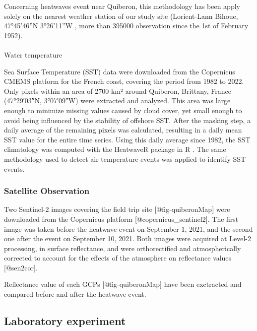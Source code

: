 \documentclass[
  number]{elsarticle}
\makeatletter
\let\oldparagraph\paragraph
\renewcommand{\paragraph}{
    \@ifstar
      \xxxParagraphStar
      \xxxParagraphNoStar
  }
\newcommand{\xxxParagraphStar}[1]{\oldparagraph*{#1}\mbox{}}
\newcommand{\xxxParagraphNoStar}[1]{\oldparagraph{#1}\mbox{}}
\makeatother
\begin{document}
Concerning heatwaves event near Quiberon, this methodology has been
apply solely on the nearest weather station of our study site
(Lorient-Lann Bihoue, 47°45'46''N 3°26'11''W , more than 395000
observation since the 1st of February 1952).

\paragraph{Water temperature}\label{water-temperature}

Sea Surface Temperature (SST) data were downloaded from the Copernicus
CMEMS platform \citep{CMEMS_1} for the French coast, covering the period
from 1982 to 2022. Only pixels within an area of 2700 km² around
Quiberon, Brittany, France (47°29′03″N, 3°07′09″W) were extracted and
analyzed. This area was large enough to minimize missing values caused
by cloud cover, yet small enough to avoid being influenced by the
stability of offshore SST. After the masking step, a daily average of
the remaining pixels was calculated, resulting in a daily mean SST value
for the entire time series. Using this daily average since 1982, the SST
climatology was computed with the HeatwaveR package in R
\citep{heatwaveR}. The same methodology used to detect air temperature
events was applied to identify SST events.

\subsubsection{Satellite Observation}\label{satellite-observation}

Two Sentinel-2 images covering the field trip site
{[}@fig-quiberonMap{]} were downloaded from the Copernicus platform
{[}@copernicus\_sentinel2{]}. The first image was taken before the
heatwave event on September 1, 2021, and the second one after the event
on September 10, 2021. Both images were acquired at Level-2 processing,
in surface reflectance, and were orthorectified and atmospherically
corrected to account for the effects of the atmosphere on reflectance
values {[}@sen2cor{]}.~

Reflectance value of each GCPs {[}@fig-quiberonMap{]} have been
exctracted and compared before and after the heatwave event.

\subsection{Laboratory experiment}\label{laboratory-experiment}
\end{document}
